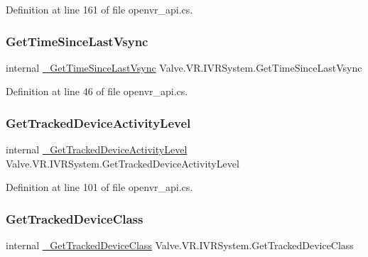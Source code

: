 Definition at line 161 of file openvr\+\_\+api.\+cs.

\mbox{\label{struct_valve_1_1_v_r_1_1_i_v_r_system_a25109bd3030fde7863c8a1167d2c6bb4}} 
\subsubsection{\texorpdfstring{GetTimeSinceLastVsync}{GetTimeSinceLastVsync}}
{\footnotesize\ttfamily internal \mbox{\hyperlink{struct_valve_1_1_v_r_1_1_i_v_r_system_ab4843adda277e53c0307051b2ec21cc8}{\+\_\+\+Get\+Time\+Since\+Last\+Vsync}} Valve.\+V\+R.\+I\+V\+R\+System.\+Get\+Time\+Since\+Last\+Vsync}



Definition at line 46 of file openvr\+\_\+api.\+cs.

\mbox{\label{struct_valve_1_1_v_r_1_1_i_v_r_system_acc4284c334c1b50f84803018f7efea60}} 
\subsubsection{\texorpdfstring{GetTrackedDeviceActivityLevel}{GetTrackedDeviceActivityLevel}}
{\footnotesize\ttfamily internal \mbox{\hyperlink{struct_valve_1_1_v_r_1_1_i_v_r_system_af6da0a3c81f4645a74f3ae34d3c050b6}{\+\_\+\+Get\+Tracked\+Device\+Activity\+Level}} Valve.\+V\+R.\+I\+V\+R\+System.\+Get\+Tracked\+Device\+Activity\+Level}



Definition at line 101 of file openvr\+\_\+api.\+cs.

\mbox{\label{struct_valve_1_1_v_r_1_1_i_v_r_system_a889385c93465cef3035571bb7a89c98e}} 
\subsubsection{\texorpdfstring{GetTrackedDeviceClass}{GetTrackedDeviceClass}}
{\footnotesize\ttfamily internal \mbox{\hyperlink{struct_valve_1_1_v_r_1_1_i_v_r_system_a012f6620d3faad15d7622c5c53b091e8}{\+\_\+\+Get\+Tracked\+Device\+Class}} Valve.\+V\+R.\+I\+V\+R\+System.\+Get\+Tracked\+Device\+Class}



